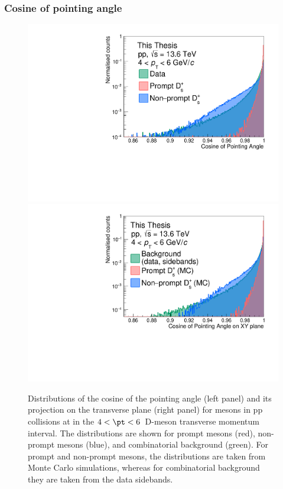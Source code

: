 \subsubsection{Cosine of pointing angle}
\begin{figure}[tb]
    \centering
    \includegraphics[width=0.48\linewidth]{Figures/Chapter 4/Cpa.pdf}
    \includegraphics[width=0.48\linewidth]{Figures/Chapter 4/CpaXY.pdf}
    \caption{Distributions of the cosine of the pointing angle (left panel) and its
    projection on the transverse plane (right panel) for \ds mesons in pp collisions at \thirteen in the $4 < \pt < 6$~\gevc D-meson transverse momentum interval. The distributions are shown for prompt \ds mesons (red), non-prompt \ds mesons (blue), and combinatorial background (green). For prompt and non-prompt \ds mesons, the distributions are taken from Monte Carlo simulations, whereas for combinatorial background they are taken from the data sidebands.}
    \label{fig:PointingAngle}
\end{figure}


